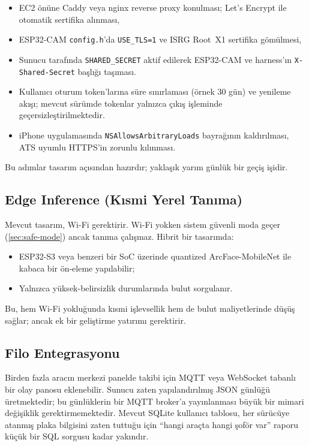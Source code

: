 \begin{itemize}
    \item EC2 önüne Caddy veya nginx reverse proxy konulması; Let's Encrypt
          ile otomatik sertifika alınması,
    \item ESP32-CAM \texttt{config.h}'da \texttt{USE\_TLS=1} ve ISRG Root~X1
          sertifika gömülmesi,
    \item Sunucu tarafında \texttt{SHARED\_SECRET} aktif edilerek
          ESP32-CAM ve harness'ın \texttt{X-Shared-Secret} başlığı
          taşıması.
    \item Kullanıcı oturum token'larına süre sınırlaması (örnek 30 gün)
          ve yenileme akışı; mevcut sürümde tokenlar yalnızca çıkış
          işleminde geçersizleştirilmektedir.
    \item iPhone uygulamasında \texttt{NSAllowsArbitraryLoads} bayrağının
          kaldırılması, ATS uyumlu HTTPS'in zorunlu kılınması.
\end{itemize}

Bu adımlar tasarım açısından hazırdır; yaklaşık yarım günlük bir geçiş
işidir.

\subsection{Edge Inference (Kısmi Yerel Tanıma)}

Mevcut tasarım, Wi-Fi gerektirir. Wi-Fi yokken sistem güvenli moda geçer
(\ref{sec:safe-mode}) ancak tanıma çalışmaz. Hibrit bir tasarımda:

\begin{itemize}
    \item ESP32-S3 veya benzeri bir SoC üzerinde quantized ArcFace-MobileNet
          ile kabaca bir ön-eleme yapılabilir;
    \item Yalnızca yüksek-belirsizlik durumlarında bulut sorgulanır.
\end{itemize}

Bu, hem Wi-Fi yokluğunda kısmi işlevsellik hem de bulut maliyetlerinde
düşüş sağlar; ancak ek bir geliştirme yatırımı gerektirir.

\subsection{Filo Entegrasyonu}

Birden fazla aracın merkezi panelde takibi için MQTT veya WebSocket
tabanlı bir olay panosu eklenebilir. Sunucu zaten yapılandırılmış JSON
günlüğü üretmektedir; bu günlüklerin bir MQTT broker'a yayınlanması
büyük bir mimari değişiklik gerektirmemektedir. Mevcut SQLite kullanıcı
tablosu, her sürücüye atanmış plaka bilgisini zaten tuttuğu için
``hangi araçta hangi şoför var'' raporu küçük bir SQL sorgusu kadar
yakındır.

